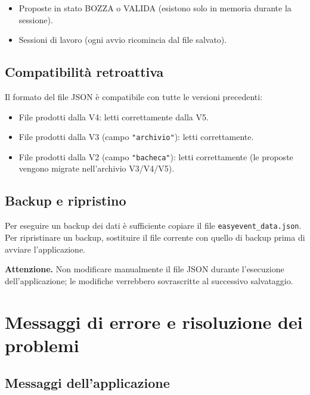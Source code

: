 \documentclass[12pt,a4paper,oneside]{report}
\newcommand{\cmd}[1]{\texttt{\small#1}}
\newcommand{\file}[1]{\texttt{\small#1}}
\begin{document}
\begin{itemize}
  \item Proposte in stato BOZZA o VALIDA (esistono solo in memoria durante la sessione).
  \item Sessioni di lavoro (ogni avvio ricomincia dal file salvato).
\end{itemize}

\section{Compatibilità retroattiva}

Il formato del file JSON è compatibile con tutte le versioni precedenti:
\begin{itemize}
  \item File prodotti dalla V4: letti correttamente dalla V5.
  \item File prodotti dalla V3 (campo \cmd{"archivio"}): letti correttamente.
  \item File prodotti dalla V2 (campo \cmd{"bacheca"}): letti correttamente (le proposte vengono migrate nell'archivio V3/V4/V5).
\end{itemize}

\section{Backup e ripristino}

Per eseguire un backup dei dati è sufficiente copiare il file \file{easyevent\_data.json}.
Per ripristinare un backup, sostituire il file corrente con quello di backup prima di avviare l'applicazione.

\begin{avvisobox}
\textbf{Attenzione.} Non modificare manualmente il file JSON durante l'esecuzione dell'applicazione; le modifiche verrebbero sovrascritte al successivo salvataggio.
\end{avvisobox}

\chapter{Messaggi di errore e risoluzione dei problemi}
\label{cap:errori}

\section{Messaggi dell'applicazione}
\end{document}
